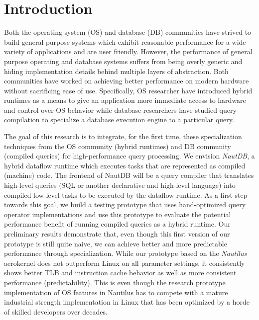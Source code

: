 \documentclass[conference]{IEEEtran}
\begin{document}
\section{Introduction}

  Both the operating system (OS) and database (DB) communities have strived to build general purpose systems which exhibit reasonable performance for a wide variety of applications and are user friendly.
  However, the performance of general purpose operating and database systems suffers from being overly generic and hiding implementation details behind multiple layers of abstraction.
Both communities have worked on achieving better performance on modern hardware without sacrificing ease of use. Specifically, OS researcher have introduced hybrid runtimes as a means to give an application more immediate access to hardware and control over OS behavior while database researchers have studied query compilation to specialize a database execution engine to a particular query.


The goal of this research is to integrate, for the first time, these specialization techniques from the OS community (hybrid runtimes) and DB community (compiled queries) for high-performance query processing.
%
We envision \emph{NautDB}, a hybrid dataflow runtime which executes tasks that are represented as compiled (machine) code. The frontend of NautDB will be a query compiler that translates high-level queries (SQL or another declarative and high-level language) into compiled low-level tasks to be executed by the dataflow runtime. 
As a first step towards this goal, we build a testing prototype that uses hand-optimized query operator implementations and use this prototype to evaluate the potential performance benefit of running compiled queries as a hybrid runtime.
%
Our preliminary results demonstrate that, even though this first version of our prototype is still quite naive, we can achieve better and more predictable performance through specialization.
%
While our prototype based on the \emph{Nautilus} aerokernel does not outperform Linux on all parameter settings, it consistently shows better TLB and instruction cache behavior as well as more consistent performance (predictability). This is even though the  research prototype implementation of OS features in Nautilus has to compete with a mature industrial strength implementation in Linux that has been optimized by a horde of skilled developers over decades. 


\end{document}

